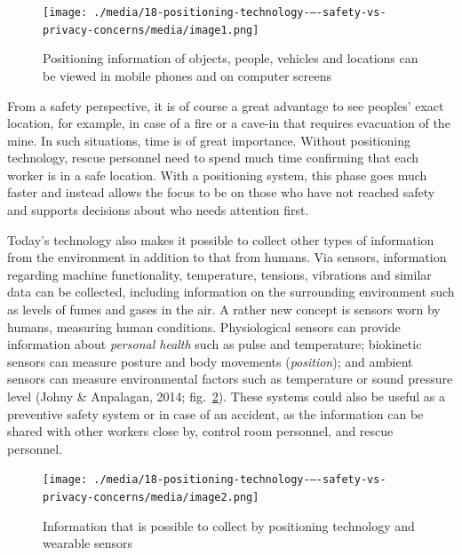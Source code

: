\documentclass[
  12pt,
]{scrbook}
\begin{document}
\begin{figure}
\hypertarget{fig:figure171}{%
\centering
\texttt{[image: ./media/18-positioning-technology-–-safety-vs-privacy-concerns/media/image1.png]}
\caption[Positioning information of objects, people, vehicles and locations can be viewed in mobile phones and on computer screens]{Positioning information of objects, people, vehicles and locations can be viewed in mobile phones and on computer screens\footnotemark{}}\label{fig:figure171}
}
\end{figure}

From a safety perspective, it is of course a great advantage to see peoples' exact location, for example, in case of a fire or a cave-in that requires evacuation of the mine. In such situations, time is of great importance. Without positioning technology, rescue personnel need to spend much time confirming that each worker is in a safe location. With a positioning system, this phase goes much faster and instead allows the focus to be on those who have not reached safety and supports decisions about who needs attention first.~

Today's technology also makes it possible to collect other types of information from the environment in addition to that from humans. Via sensors, information regarding machine functionality, temperature, tensions, vibrations and similar data can be collected, including information on the surrounding environment such as levels of fumes and gases in the air. A rather new concept is sensors worn by humans, measuring human conditions. Physiological sensors can provide information about \emph{personal health} such as pulse and temperature; biokinetic sensors can measure posture and body movements (\emph{position}); and ambient sensors can measure environmental factors such as temperature or sound pressure level (Johny \& Anpalagan, 2014; fig.~\ref{fig:figure172}). These systems could also be useful as a preventive safety system or in case of an accident, as the information can be shared with other workers close by, control room personnel, and rescue personnel.~

\begin{figure}
\hypertarget{fig:figure172}{%
\centering
\texttt{[image: ./media/18-positioning-technology-–-safety-vs-privacy-concerns/media/image2.png]}
\caption[Information that is possible to collect by positioning technology and wearable sensors]{Information that is possible to collect by positioning technology and wearable sensors\footnotemark{}}\label{fig:figure172}
}
\end{figure}
\end{document}
